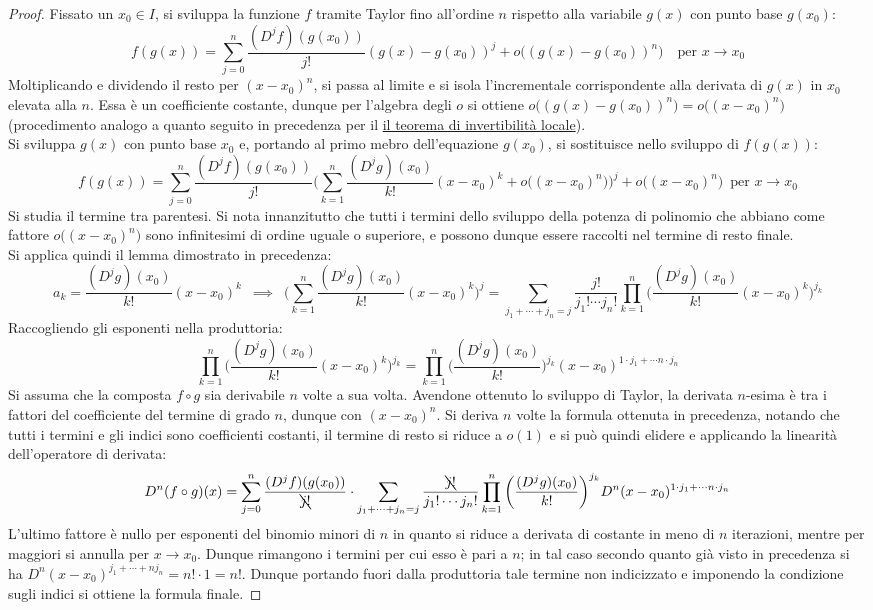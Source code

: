 \documentclass[10pt]{article}
\theoremstyle{plain}
\begin{document}
\begin{proof}
Fissato un $x_0 \in I$, si sviluppa la funzione $f$ tramite Taylor fino all'ordine $n$ rispetto alla variabile $g(x)$ con punto base $g(x_0)$:
\[f(g(x)) = \sum \limits_{j = 0}^n \frac{(D^jf)(g(x_0))}{j!}(g(x) - g(x_0))^j + o\big((g(x) - g(x_0))^n\big) \quad \textrm{per } x \rightarrow x_0\]
Moltiplicando e dividendo il resto per $(x - x_0)^n$, si passa al limite e si isola l'incrementale corrispondente alla derivata di $g(x)$ in $x_0$ elevata alla $n$. Essa è un coefficiente costante, dunque per l'algebra degli $o$ si ottiene $o\big((g(x) - g(x_0))^n\big) = o\big((x - x_0)^n\big)$ (procedimento analogo a quanto seguito in precedenza per il \hyperlink{cos}{il teorema di invertibilità locale}).
\\Si sviluppa $g(x)$ con punto base $x_0$ e, portando al primo mebro dell'equazione $g(x_0)$, si sostituisce nello sviluppo di $f(g(x))$:
\[f(g(x)) = \sum \limits_{j = 0}^n \frac{(D^jf)(g(x_0))}{j!} \bigg( \sum \limits_{k = 1}^n \frac{(D^jg)(x_0)}{k!}(x-x_0)^k + o\big((x-x_0)^n\big) \bigg)^j + o\big((x-x_0)^n\big) \enspace \textrm{per } x \rightarrow x_0\]
Si studia il termine tra parentesi. Si nota innanzitutto che tutti i termini dello sviluppo della potenza di polinomio che abbiano come fattore $o\big((x-x_0)^n\big)$ sono infinitesimi di ordine uguale o superiore, e possono dunque essere raccolti nel termine di resto finale.
\\Si applica quindi il lemma dimostrato in precedenza:
\[a_k = \frac{(D^jg)(x_0)}{k!}(x-x_0)^k \enspace \implies \enspace \bigg( \sum \limits_{k = 1}^n \frac{(D^jg)(x_0)}{k!}(x-x_0)^k \bigg)^j = \sum \limits_{j_1 + \cdots +j_n = j} \frac{j!}{j_1! \cdots j_n!} \prod \limits_{k=1}^{n}\bigg(\frac{(D^jg)(x_0)}{k!}(x-x_0)^k\bigg)^{j_k}\]
Raccogliendo gli esponenti nella produttoria:
\[\prod \limits_{k=1}^{n}\bigg(\frac{(D^jg)(x_0)}{k!}(x-x_0)^k\bigg)^{j_k} = \prod \limits_{k=1}^{n}\bigg(\frac{(D^jg)(x_0)}{k!}\bigg)^{j_k}(x-x_0)^{1 \cdot j_1 + \cdots n \cdot j_n}\]
Si assuma che la composta $f \circ g$ sia derivabile $n$ volte a sua volta. Avendone ottenuto lo sviluppo di Taylor, la derivata $n$-esima è tra i fattori del coefficiente del termine di grado $n$, dunque con $(x-x_0)^n$. Si deriva $n$ volte la formula ottenuta in precedenza, notando che tutti i termini e gli indici sono coefficienti costanti, il termine di resto si riduce a $o(1)$ e si può quindi elidere e applicando la linearità dell'operatore di derivata:
\[D^n(f \circ g) (x) = \sum \limits_{j = 0}^n \frac{(D^jf)(g(x_0))}{\bcancel{j!}} \cdot \sum \limits_{j_1 + \cdots +j_n = j} \frac{\bcancel{j!}}{j_1! \cdots j_n!} \prod \limits_{k=1}^{n}\bigg(\frac{(D^jg)(x_0)}{k!}\bigg)^{j_k}D^n(x-x_0)^{1 \cdot j_1 + \cdots n \cdot j_n}\]
L'ultimo fattore è nullo per esponenti del binomio minori di $n$ in quanto si riduce a derivata di costante in meno di $n$ iterazioni, mentre per maggiori si annulla per $x \rightarrow x_0$. Dunque rimangono i termini per cui esso è pari a $n$; in tal caso secondo quanto già visto in precedenza si ha $D^n (x-x_0)^{j_1 + \cdots + n j_n} = n! \cdot 1 = n!$. Dunque portando fuori dalla produttoria tale termine non indicizzato e imponendo la condizione sugli indici si ottiene la formula finale.
\end{proof}
\end{document}
